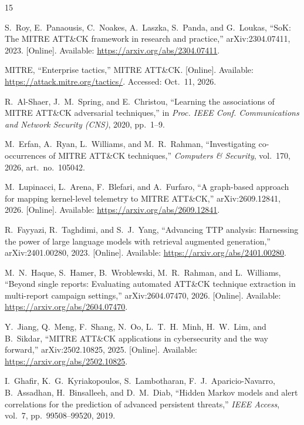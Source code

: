 \documentclass[conference]{IEEEtran}
\begin{document}

\begin{thebibliography}{15}

S.~Roy, E.~Panaousis, C.~Noakes, A.~Laszka, S.~Panda, and G.~Loukas, ``SoK: The MITRE ATT\&CK framework in research and practice,'' arXiv:2304.07411, 2023. [Online]. Available: \url{https://arxiv.org/abs/2304.07411}.

MITRE, ``Enterprise tactics,'' MITRE ATT\&CK. [Online]. Available: \url{https://attack.mitre.org/tactics/}. Accessed: Oct.~11, 2026.

R.~Al-Shaer, J.~M.~Spring, and E.~Christou, ``Learning the associations of MITRE ATT\&CK adversarial techniques,'' in \emph{Proc. IEEE Conf. Communications and Network Security (CNS)}, 2020, pp.~1--9.

M.~Erfan, A.~Ryan, L.~Williams, and M.~R.~Rahman, ``Investigating co-occurrences of MITRE ATT\&CK techniques,'' \emph{Computers \& Security}, vol.~170, 2026, art.~no.~105042.

M.~Lupinacci, L.~Arena, F.~Blefari, and A.~Furfaro, ``A graph-based approach for mapping kernel-level telemetry to MITRE ATT\&CK,'' arXiv:2609.12841, 2026. [Online]. Available: \url{https://arxiv.org/abs/2609.12841}.

R.~Fayyazi, R.~Taghdimi, and S.~J.~Yang, ``Advancing TTP analysis: Harnessing the power of large language models with retrieval augmented generation,'' arXiv:2401.00280, 2023. [Online]. Available: \url{https://arxiv.org/abs/2401.00280}.

M.~N.~Haque, S.~Hamer, B.~Wroblewski, M.~R.~Rahman, and L.~Williams, ``Beyond single reports: Evaluating automated ATT\&CK technique extraction in multi-report campaign settings,'' arXiv:2604.07470, 2026. [Online]. Available: \url{https://arxiv.org/abs/2604.07470}.

Y.~Jiang, Q.~Meng, F.~Shang, N.~Oo, L.~T.~H.~Minh, H.~W.~Lim, and B.~Sikdar, ``MITRE ATT\&CK applications in cybersecurity and the way forward,'' arXiv:2502.10825, 2025. [Online]. Available: \url{https://arxiv.org/abs/2502.10825}.

I.~Ghafir, K.~G.~Kyriakopoulos, S.~Lambotharan, F.~J.~Aparicio-Navarro, B.~Assadhan, H.~Binsalleeh, and D.~M.~Diab, ``Hidden Markov models and alert correlations for the prediction of advanced persistent threats,'' \emph{IEEE Access}, vol.~7, pp.~99508--99520, 2019.


\end{thebibliography}
\end{document}
